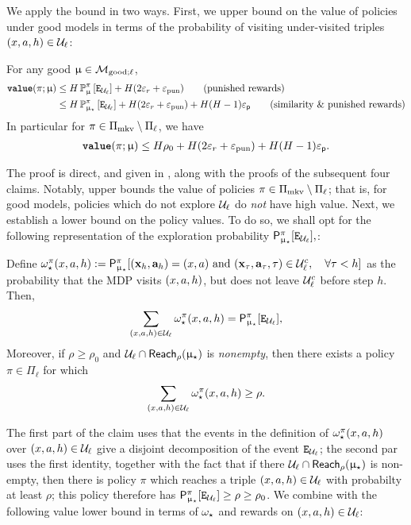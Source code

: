 We apply the bound in two ways. First, we upper bound on the value of policies under good models in terms of the probability of visiting under-visited triples $(x,a,h) \in \mathcal{U}_{\ell}$:
\begin{claim}\label{claim:value_upper_bound} For any good $\upmu \in \mathcal{M}_{\mathrm{good};\ell}$,
\begin{align*}
{\normalfont \texttt{\textbf{value}}}(\pi;\upmu) &\le H \operatorname{\mathbb{P}}^{\pi}_{\upmu}\left[ \texttt{E}_{\mathcal{U}_{\ell}} \right] + H (2\varepsilon_{r} + \varepsilon_{\mathrm{pun}}) \tag*{(punished rewards)}\\
&\le H \operatorname{\mathbb{P}}^{\pi}_{\upmu_{\star}}\left[ \texttt{E}_{\mathcal{U}_{\ell}} \right] + H (2\varepsilon_{r} + \varepsilon_{\mathrm{pun}}) + H(H-1)\varepsilon_{\mathsf{p}} \tag*{(similarity \& punished rewards)}
\end{align*}
In particular for $\pi \in \Pi_{\mathrm{mkv}} \setminus \Pi_{\ell}$, we have
\begin{align}
{\normalfont \texttt{\textbf{value}}}(\pi;\upmu) \le H \rho_0 + H (2\varepsilon_{r} + \varepsilon_{\mathrm{pun}}) + H(H-1)\varepsilon_{\mathsf{p}}. \label{eq:value_bound_on_Pi_l_c}
\end{align}
\end{claim}
The proof is direct, and given in , along with the proofs of the subsequent four claims. Notably,  upper bounds the value of policies  $\pi \in \Pi_{\mathrm{mkv}} \setminus \Pi_{\ell}$; that is, for good models, policies which do not explore $\mathcal{U}_{\ell}$ do \emph{not} have high value. Next, we establish a lower bound on the policy values. To do so, we shall opt for the following representation of the exploration probability $\mathsf{P}_{\upmu_{\star}}^{\pi}[\texttt{E}_{\mathcal{U}_{\ell}}],$:
\begin{claim}\label{claim:omega_star}Define $\omega_{\star}^\pi(x,a,h) :=  \mathsf{P}_{\upmu_{\star}}^{\pi}[(\mathbf{x}_h,\mathbf{a}_{h}) = (x,a) \text{ and } (\mathbf{x}_\tau,\mathbf{a}_{\tau},\tau) \in \mathcal{U}_{\ell}^c, \quad \forall \tau < h]$ as the probability that the MDP visits $(x,a,h)$, but does not leave $\mathcal{U}_\ell^c$ before step $h$. Then,
\begin{align*}
\sum_{(x,a,h) \in \mathcal{U}_\ell}\omega_{\star}^\pi(x,a,h) = \mathsf{P}_{\upmu_{\star}}^{\pi}[\texttt{E}_{\mathcal{U}_{\ell}}],
\end{align*}
Moreover, if $\rho \ge \rho_0$ and $\mathcal{U}_{\ell} \cap \mathsf{Reach}_{\rho}(\upmu_{\star})$ is \emph{nonempty}, then there exists a policy $\pi \in \Pi_{\ell}$ for which 
$$\sum_{(x,a,h) \in \mathcal{U}_\ell}\omega_{\star}^\pi(x,a,h) \ge \rho.$$
\end{claim}
The first part of the claim uses that the events in the definition of $\omega_{\star}^\pi(x,a,h)$ over $(x,a,h) \in \mathcal{U}_{\ell}$ give a disjoint decomposition of the event $\texttt{E}_{\mathcal{U}_{\ell}}$; the second par uses the first identity, together with the fact that if there $\mathcal{U}_{\ell} \cap \mathsf{Reach}_{\rho}(\upmu_{\star})$ is non-empty, then there is policy $\pi$ which reaches a triple $(x,a,h) \in \mathcal{U}_{\ell}$ with probabilty at least $\rho$; this policy therefore has $\mathsf{P}_{\upmu_{\star}}^{\pi}[\texttt{E}_{\mathcal{U}_{\ell}}] \ge \rho \ge \rho_0$.  We combine  with the following value lower bound in terms of $\omega_{\star}$ and rewards on $(x,a,h) \in \mathcal{U}_\ell$:
